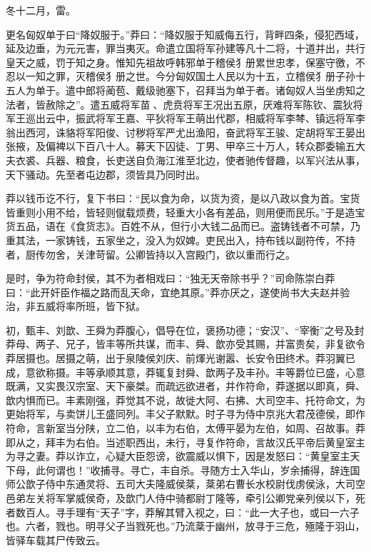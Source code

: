 \documentclass[]{article}
\begin{document}
冬十二月，雷。

更名匈奴单于曰``降奴服于。''莽曰：``降奴服于知威侮五行，背畔四条，侵犯西域，延及边垂，为元元害，罪当夷灭。命遣立国将军孙建等凡十二将，十道并出，共行皇天之威，罚于知之身。惟知先祖故呼韩邪单于稽侯犭册累世忠孝，保塞守徼，不忍以一知之罪，灭稽侯犭册之世。今分匈奴国土人民以为十五，立稽侯犭册子孙十五人为单于。遣中郎将蔺苞、戴级驰塞下，召拜当为单于者。诸匈奴人当坐虏知之法者，皆赦除之''。遣五威将军苗、虎贲将军王况出五原，厌难将军陈钦、震狄将军王巡出云中，振武将军王嘉、平狄将军王萌出代郡，相威将军李棽、镇远将军李翁出西河，诛貉将军阳俊、讨秽将军严尤出渔阳，奋武将军王骏、定胡将军王晏出张掖，及偏裨以下百八十人。募天下囚徒、丁男、甲卒三十万人，转众郡委输五大夫衣裘、兵器、粮食，长吏送自负海江淮至北边，使者驰传督趣，以军兴法从事，天下骚动。先至者屯边郡，须皆具乃同时出。

莽以钱币讫不行，复下书曰：``民以食为命，以货为资，是以八政以食为首。宝货皆重则小用不给，皆轻则僦载烦费，轻重大小各有差品，则用便而民乐。''于是造宝货五品，语在《食货志》。百姓不从，但行小大钱二品而已。盗铸钱者不可禁，乃重其法，一家铸钱，五家坐之，没入为奴婢。吏民出入，持布钱以副符传，不持者，厨传勿舍，关津苛留。公卿皆持以入宫殿门，欲以重而行之。

是时，争为符命封侯，其不为者相戏曰：``独无天帝除书乎？''司命陈崇白莽曰：``此开奸臣作福之路而乱天命，宜绝其原。''莽亦厌之，遂使尚书大夫赵并验治，非五威将率所班，皆下狱。

初，甄丰、刘歆、王舜为莽腹心，倡导在位，褒扬功德；``安汉''、``宰衡''之号及封莽母、两子、兄子，皆丰等所共谋，而丰、舜、歆亦受其赐，并富贵矣，非复欲令莽居摄也。居摄之萌，出于泉陵侯刘庆、前煇光谢嚣、长安令田终术。莽羽翼已成，意欲称摄。丰等承顺其意，莽辄复封舜、歆两子及丰孙。丰等爵位已盛，心意既满，又实畏汉宗室、天下豪桀。而疏远欲进者，并作符命，莽遂据以即真，舜、歆内惧而已。丰素刚强，莽觉其不说，故徙大阿、右拂、大司空丰、托符命文，为更始将军，与卖饼儿王盛同列。丰父子默默。时子寻为侍中京兆大君茂德侯，即作符命，言新室当分陕，立二伯，以丰为右伯，太傅平晏为左伯，如周、召故事。莽即从之，拜丰为右伯。当述职西出，未行，寻复作符命，言故汉氏平帝后黄皇室主为寻之妻。莽以诈立，心疑大臣怨谤，欲震威以惧下，因是发怒曰：``黄皇室主天下母，此何谓也！''收捕寻。寻亡，丰自杀。寻随方士入华山，岁余捕得，辞连国师公歆子侍中东通灵将、五司大夫隆威侯棻，棻弟右曹长水校尉伐虏侯泳，大司空邑弟左关将军掌威侯奇，及歆门人侍中骑都尉丁隆等，牵引公卿党亲列侯以下，死者数百人。寻手理有``天子''字，莽解其臂入视之，曰：``此一大子也，或曰一六子也。六者，戮也。明寻父子当戮死也。''乃流棻于幽州，放寻于三危，殛隆于羽山，皆驿车载其尸传致云。
\end{document}
